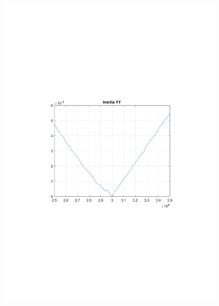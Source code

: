 \documentclass[table]{beamer}
\begin{document}
\begin{frame}[c]
\begin{columns}[c]
\begin{figure}
				\includegraphics[trim=4cm 9cm 4cm 9.5cm, clip=true, width=\linewidth]{img/inertia_yy}
				\vskip 0mm

\end{figure}
\end{columns}
\end{frame}
\end{document}
